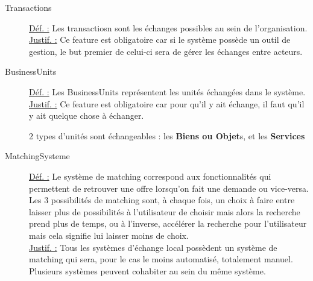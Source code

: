 \begin{description}
\begin{center}
\end{center}

\item [Transactions]
\underline{Déf. :}  Les transactiosn sont les échanges possibles au sein de l'organisation.
\\ \underline{Justif. :}  Ce feature est obligatoire car si le système possède un outil de gestion,  le but premier de celui-ci sera de gérer les échanges entre acteurs.
\newline

\item [BusinessUnits]
\underline{Déf. :}  Les BusinessUnits représentent les unités échangées dans le système.
\\ \underline{Justif. :}  Ce feature est obligatoire car pour qu'il y ait échange,  il faut qu'il y ait quelque chose à échanger.
\newline

2 types d'unités sont échangeables : les \textbf{Biens ou Objet}s,  et les \textbf{Services}

%

\item [MatchingSysteme]
\underline{Déf. :}  Le système de matching correspond aux fonctionnalités qui permettent de retrouver une offre lorsqu'on fait une demande ou vice-versa.  Les 3 possibilités de matching sont,  à chaque fois,  un choix à faire entre laisser plus de possibilités à l'utilisateur de choisir mais alors la recherche prend plus de temps,  ou à l'inverse,  accélérer la recherche pour l'utilisateur mais cela signifie lui laisser moins de choix.
\\ \underline{Justif. :}  Tous les systèmes d'échange local possèdent un système de matching qui sera,  pour le cas le moins automatisé,  totalement manuel.  Plusieurs systèmes peuvent cohabiter au sein du même système.
\newline


\end{description}
